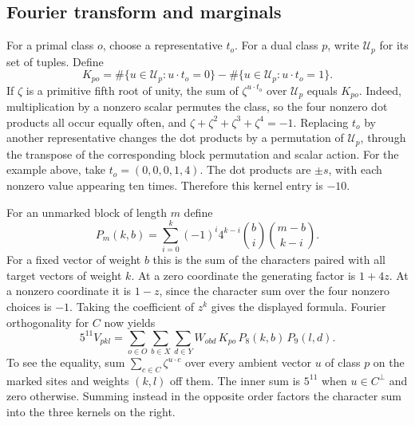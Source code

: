 \subsection{Fourier transform and marginals}

For a primal class \(o\), choose a representative \(t_o\). For a dual class \(p\), write \(\mathcal U_p\) for its set of tuples. Define
\begin{equation}\label{eq:marked-local-kernel}
 K_{po}
 =
 \#\{u\in\mathcal U_p:u\cdot t_o=0\}
 -
 \#\{u\in\mathcal U_p:u\cdot t_o=1\}.
\end{equation}
If \(\zeta\) is a primitive fifth root of unity, the sum of \(\zeta^{u\cdot t_o}\) over \(\mathcal U_p\) equals \(K_{po}\). Indeed, multiplication by a nonzero scalar permutes the class, so the four nonzero dot products all occur equally often, and \(\zeta+\zeta^2+\zeta^3+\zeta^4=-1\). Replacing \(t_o\) by another representative changes the dot products by a permutation of \(\mathcal U_p\), through the transpose of the corresponding block permutation and scalar action. For the example above, take \(t_o=(0,0,0,1,4)\). The dot products are \(\pm s\), with each nonzero value appearing ten times. Therefore this kernel entry is \(-10\).

For an unmarked block of length \(m\) define
\[
 P_m(k,b)=
 \sum_{i=0}^k(-1)^i4^{k-i}\binom bi\binom{m-b}{k-i}.
\]
For a fixed vector of weight \(b\) this is the sum of the characters paired with all target vectors of weight \(k\). At a zero coordinate the generating factor is \(1+4z\). At a nonzero coordinate it is \(1-z\), since the character sum over the four nonzero choices is \(-1\). Taking the coefficient of \(z^k\) gives the displayed formula. Fourier orthogonality for \(C\) now yields
\begin{equation}\label{eq:marked-fourier}
 5^{11}V_{pkl}
  =\sum_{o\in O}\sum_{b\in X}\sum_{d\in Y}
       W_{obd}\,K_{po}\,P_8(k,b)\,P_9(l,d).
\end{equation}
To see the equality, sum \(\sum_{c\in C}\zeta^{u\cdot c}\) over every ambient vector \(u\) of class \(p\) on the marked sites and weights \((k,l)\) off them. The inner sum is \(5^{11}\) when \(u\in C^\perp\) and zero otherwise. Summing instead in the opposite order factors the character sum into the three kernels on the right.


